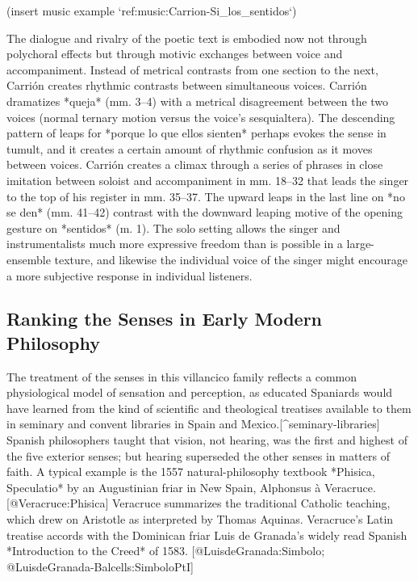 (insert music example `ref:music:Carrion-Si_los_sentidos`)
\label{music:Carrion-Si_los_sentidos}

The dialogue and rivalry of the poetic text is embodied now not through
polychoral effects but through motivic exchanges between voice and
accompaniment. 
Instead of metrical contrasts from one section to the next, Carrión creates
rhythmic contrasts between simultaneous voices. 
Carrión dramatizes *queja* (mm. 3--4) with a metrical disagreement between the
two voices (normal ternary motion versus the voice's sesquialtera).
The descending pattern of leaps for *porque lo que ellos sienten* perhaps
evokes the sense in tumult, and it creates a certain amount of rhythmic
confusion as it moves between voices. 
Carrión creates a climax through a series of phrases in close imitation between
soloist and accompaniment in mm. 18--32 that leads the singer to the top of his
register in mm. 35--37. 
The upward leaps in the last line on *no se den* (mm. 41--42) contrast with the
downward leaping motive of the opening gesture on *sentidos* (m. 1). 
The solo setting allows the singer and instrumentalists much more expressive
freedom than is possible in a large-ensemble texture, and likewise the
individual voice of the singer might encourage a more subjective response in
individual listeners.


\subsection{Ranking the Senses in Early Modern Philosophy}

The treatment of the senses in this villancico family reflects a common
physiological model of sensation and perception, as educated Spaniards would
have learned from the kind of scientific and theological treatises available to
them in seminary and convent libraries in Spain and Mexico.[^seminary-libraries]
Spanish philosophers taught that vision, not hearing, was the first and highest
of the five exterior senses; but hearing superseded the other
senses in matters of faith.
A typical example is the 1557 natural-philosophy textbook *Phisica, Speculatio*
by an Augustinian friar in New Spain, Alphonsus à Veracruce. 
[@Veracruce:Phisica]
Veracruce summarizes the traditional Catholic teaching, which drew on Aristotle
as interpreted by Thomas Aquinas. 
Veracruce's Latin treatise accords with the Dominican friar Luis de Granada's
widely read Spanish *Introduction to the Creed* of 1583. 
[@LuisdeGranada:Simbolo; @LuisdeGranada-Balcells:SimboloPtI]

